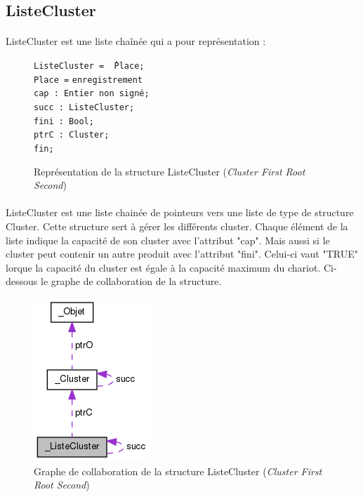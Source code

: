 \documentclass[twoside,UTF8]{EPURapport}
\begin{document}
\subsection{ListeCluster}

\paragraph{}
ListeCluster est une liste cha\^inée qui a pour représentation :

\begin{figure}[H]

\begin{tabbing}
\texttt{ListeCluster = \^\,Place;} \\
\texttt{Place =} \= \texttt{enregistrement} \\
\> \texttt{cap : Entier non signé;} \\
\> \texttt{succ : ListeCluster;} \\
\> \texttt{fini : Bool;} \\
\> \texttt{ptrC : Cluster;} \\
\> \texttt{fin; } \\
\end{tabbing}

\caption{Représentation de la structure ListeCluster (\textit{Cluster First Root Second})}
\end{figure}

\paragraph{}ListeCluster est une liste chainée de pointeurs vers une liste de type de structure Cluster. Cette structure sert à gérer les différents cluster. Chaque élément de la liste indique la capacité de son cluster avec l'attribut "cap". Mais aussi si le cluster peut contenir un autre produit avec l'attribut "fini". Celui-ci vaut "TRUE" lorque la capacité du cluster est égale à la capacité maximum du chariot.
Ci-dessous le graphe de collaboration de la structure.

\begin{figure}[H]
\center
\includegraphics[scale=0.5]{images/struct_liste_cluster.png}
\caption{Graphe de collaboration de la structure ListeCluster (\textit{Cluster First Root Second})}
\end{figure} 
\end{document}
